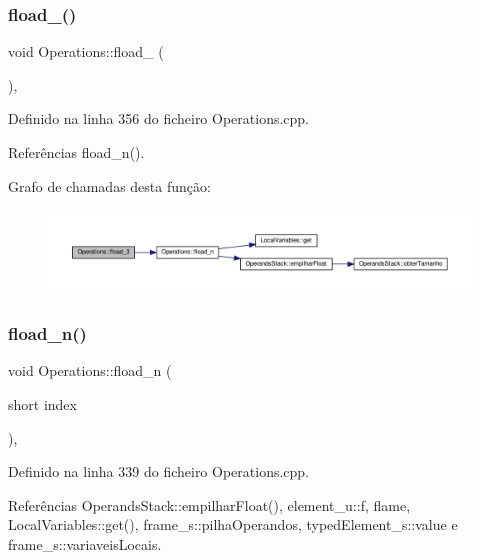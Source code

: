 \subsubsection{\texorpdfstring{fload\+\_()}{fload\_3()}}
{\footnotesize\ttfamily void Operations\+::fload\+\_ (\begin{DoxyParamCaption}{ }\end{DoxyParamCaption})\hspace{0.3cm}{\ttfamily [static]}, {\ttfamily [private]}}



Definido na linha 356 do ficheiro Operations.\+cpp.



Referências fload\+\_\+n().

Grafo de chamadas desta função\+:
\nopagebreak
\begin{figure}[H]
\begin{center}
\leavevmode
\includegraphics[width=350pt]{classOperations_a1d7d4685fea35e0619ff468ed57a4f94_cgraph}
\end{center}
\end{figure}
\mbox{\label{classOperations_af466511fbbf8fd71f6dd31b0433df181}} 
\subsubsection{\texorpdfstring{fload\+\_\+n()}{fload\_n()}}
{\footnotesize\ttfamily void Operations\+::fload\+\_\+n (\begin{DoxyParamCaption}\item[{short}]{index }\end{DoxyParamCaption})\hspace{0.3cm}{\ttfamily [static]}, {\ttfamily [private]}}



Definido na linha 339 do ficheiro Operations.\+cpp.



Referências Operands\+Stack\+::empilhar\+Float(), element\+\_\+u\+::f, flame, Local\+Variables\+::get(), frame\+\_\+s\+::pilha\+Operandos, typed\+Element\+\_\+s\+::value e frame\+\_\+s\+::variaveis\+Locais.




